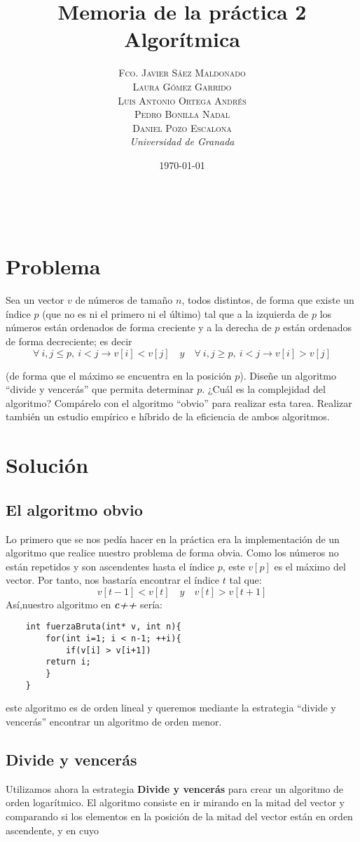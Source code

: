 \documentclass[a4paper, 11pt]{article}
\title{\textbf{Memoria de la práctica 2}\\ %
Algorítmica} %
\author{\textsc{Fco. Javier Sáez Maldonado}\\ %
\textsc{Laura Gómez Garrido}\\
\textsc{Luis Antonio Ortega Andrés}\\
\textsc{Pedro Bonilla Nadal}\\
\textsc{Daniel Pozo Escalona}\vspace{2cm}
\\{\textit{Universidad de Granada}}} %
\date{\today} %
\makeatletter
\renewcommand{\maketitle}{
  \begin{flushright} %
  
  {\LARGE\@title} %
  
  \vspace{50pt} %
  
  {\large\@author} %
  \\\@date %
  \vspace{40pt} %
  \end{flushright}
}
\makeatother
\begin{document}
\maketitle %


{\parskip=2pt
  \tableofcontents
}
\pagebreak



\section{Problema}

Sea un vector $v$ de números de tamaño $n$, todos distintos, de forma que existe un índice $p$ (que no es ni el primero ni el último) tal que a la izquierda de $p$ los números están ordenados de forma creciente y a la derecha de $p$ están ordenados de forma decreciente; es decir
\[
\forall \ i,j \leq p , \ i < j \rightarrow v[i] < v[j] \quad y \quad \forall \ i,j \geq p, \ i < j \rightarrow v[i]>v[j]
\]

(de forma que el máximo se encuentra en la posición $p$). Diseñe un algoritmo ``divide y vencerás'' que permita determinar $p$. ¿Cuál es la complejidad del algoritmo? Compárelo con el algoritmo ``obvio'' para realizar esta tarea. Realizar también un estudio empírico e híbrido de la eficiencia de ambos algoritmos.

\section{Solución}

\subsection{El algoritmo obvio}
Lo primero que se nos pedía hacer en la práctica era la implementación de un algoritmo que realice nuestro problema de forma obvia. Como los números no están repetidos y son ascendentes hasta el índice $p$, este $v[p]$ es el máximo del vector. Por tanto, nos bastaría encontrar el índice $t$ tal que:
\[
v[t-1] < v[t] \quad y \quad v[t] > v[t+1]
\]
Así,nuestro algoritmo en\textbf{ \emph{c++} } sería:
\begin{lstlisting}
	int fuerzaBruta(int* v, int n){
		for(int i=1; i < n-1; ++i){
     		if(v[i] > v[i+1])
       	return i;
		}
	}
\end{lstlisting}

este algoritmo es de orden lineal y queremos mediante la estrategia ``divide y vencerás'' encontrar un algoritmo de orden menor.

\subsection{Divide y vencerás}
Utilizamos ahora la estrategia \textbf{Divide y vencerás} para crear un algoritmo de orden logarítmico. El algoritmo consiste en ir mirando en la mitad del vector y comparando si los elementos en la posición de la mitad del vector están en orden ascendente, y en cuyo 
\end{document}

